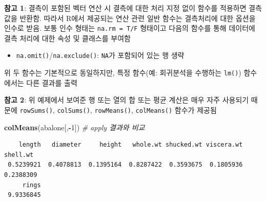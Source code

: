 \documentclass[
  11pt,
]{krantz}
\makeatletter
\newenvironment{Shaded}{\begin{snugshade}}{\end{snugshade}}
\newcommand{\CommentTok}[1]{\textcolor[rgb]{0.37,0.37,0.37}{\textit{#1}}}
\newcommand{\DecValTok}[1]{\textcolor[rgb]{0.06,0.06,0.06}{#1}}
\newcommand{\KeywordTok}[1]{\textcolor[rgb]{0.27,0.27,0.27}{\textbf{#1}}}
\newcommand{\NormalTok}[1]{#1}
\newcommand{\OperatorTok}[1]{\textcolor[rgb]{0.43,0.43,0.43}{\textbf{#1}}}
\providecommand{\tightlist}{%
  \setlength{\itemsep}{0pt}\setlength{\parskip}{0pt}}
\newenvironment{kframe}{%
\medskip{}
\setlength{\fboxsep}{.8em}
 \def\at@end@of@kframe{}%
 \ifinner\ifhmode%
  \def\at@end@of@kframe{\end{minipage}}%
  \begin{minipage}{\columnwidth}%
 \fi\fi%
 \def\FrameCommand##1{\hskip\@totalleftmargin \hskip-\fboxsep
 \colorbox{shadecolor}{##1}\hskip-\fboxsep
     \hskip-\linewidth \hskip-\@totalleftmargin \hskip\columnwidth}%
 \MakeFramed {\advance\hsize-\width
   \@totalleftmargin\z@ \linewidth\hsize
   \@setminipage}}%
 {\par\unskip\endMakeFramed%
 \at@end@of@kframe}
\newenvironment{rmdblock}[1]
  {
  \begin{itemize}
  \renewcommand{\labelitemi}{
    \raisebox{-.7\height}[0pt][0pt]{
      {\setkeys{Gin}{width=3em,keepaspectratio}\texttt{[image: images/\#1]}}
    }
  }
  \setlength{\fboxsep}{1em}
  \begin{kframe}
  \item
  }
  {
  \end{kframe}
  \end{itemize}
  }
\newenvironment{rmdtip}
  {\begin{rmdblock}{tip}}
  {\end{rmdblock}}
\makeatother
\begin{document}
\begin{rmdtip}
\begin{rmdtip}

\textbf{참고 1}: 결측이 포함된 벡터 연산 시 결측에 대한 처리 지정 없이 함수를 적용하면 결측값을 반환함. 따라서 R에서 제공되는 연산 관련 일반 함수는 결측처리에 대한 옵션을 인수로 받음. 보통 인수 형태는 \texttt{na.rm\ =\ T/F} 형태이고 다음의 함수를 통해 데이터에 결측 처리에 대한 속성 및 클래스를 부여함

\begin{itemize}
\tightlist
\item
  \texttt{na.omit()}/\texttt{na.exclude()}: \texttt{NA}가 포함되어 있는 행 생략
\end{itemize}

위 두 함수는 기본적으로 동일하지만, 특정 함수(예: 회귀분석을 수행하는 \texttt{lm()}) 함수에서는 다른 결과를 출력

\end{rmdtip}
\end{rmdtip}

\normalsize

\footnotesize

\begin{rmdtip}
\begin{rmdtip}

\textbf{참고 2}: 위 예제에서 보여준 행 또는 열의 합 또는 평균 계산은 매우 자주 사용되기 때문에 \texttt{rowSums()}, \texttt{colSums()}, \texttt{rowMeans()}, \texttt{colMeans()} 함수가 제공됨

\end{rmdtip}
\end{rmdtip}

\normalsize

\footnotesize

\begin{Shaded}
\begin{Highlighting}[]
\KeywordTok{colMeans}\NormalTok{(abalone[,}\OperatorTok{-}\DecValTok{1}\NormalTok{]) }\CommentTok{# apply 결과와 비교}
\end{Highlighting}
\end{Shaded}

\begin{verbatim}
    length   diameter     height   whole.wt shucked.wt viscera.wt   shell.wt 
 0.5239921  0.4078813  0.1395164  0.8287422  0.3593675  0.1805936  0.2388309 
     rings 
 9.9336845 
\end{verbatim}

\normalsize
\end{document}
